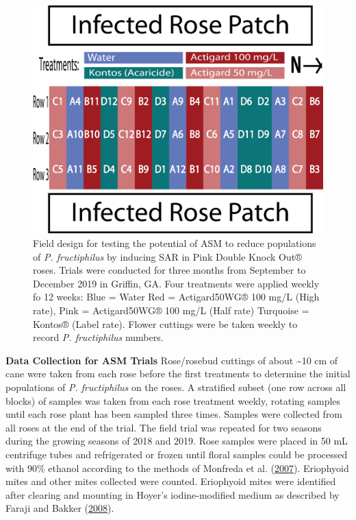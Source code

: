 \documentclass{ufdissertation}[overrideChapters] %
\begin{document}
{\begin{figure}
{\centering \includegraphics[width=1\linewidth]{figure/rrv_asm_plot_2019_griffin} 

}

\caption[Field design for testing the potential of ASM to reduce populations of \textit{P. fructiphilus}]{Field design for testing the potential of ASM to reduce populations of \textit{P. fructiphilus} by inducing SAR in Pink Double Knock Out® roses. Trials were conducted for three months from September to December 2019 in Griffin, GA. Four treatments were applied weekly fo 12 weeks: Blue = Water Red = Actigard50WG® 100 \si{\milli\gram}/L (High rate),  Pink = Actigard50WG® 100 \si{\milli\gram}/L (Half rate) Turquoise = Kontos® (Label rate). Flower cuttings were be taken weekly to record \textit{P. fructiphilus} numbers.}\label{fig:grif-asm-2019}
\end{figure}
\textbf{Data Collection for ASM Trials}
Rose/rosebud cuttings of about \textasciitilde10 cm of cane were taken from each rose before the first treatments to determine the initial populations of \emph{P. fructiphilus} on the roses. A stratified subset (one row across all blocks) of samples was taken from each rose treatment weekly, rotating samples until each rose plant has been sampled three times. Samples were collected from all roses at the end of the trial. The field trial was repeated for two seasons during the growing seasons of 2018 and 2019. Rose samples were placed in 50 mL centrifuge tubes and refrigerated or frozen until floral samples could be processed with 90\% ethanol according to the methods of Monfreda et al. (\protect\hyperlink{ref-Monfreda2007}{2007}). Eriophyoid mites and other mites collected were counted. Eriophyoid mites were identified after clearing and mounting in Hoyer's iodine-modified medium as described by Faraji and Bakker (\protect\hyperlink{ref-Faraji2008}{2008}).

}
\end{document}

